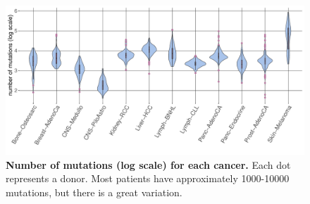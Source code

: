 \begin{figure}[h!]
    \centering
    \includegraphics[scale=0.66]{graphics/mutation_summary.pdf}
    \caption{\textbf{Number of mutations (log scale) for each cancer.} Each dot represents a donor. Most patients have approximately 1000-10000 mutations, but there is a great variation.}
    \label{fig:mutation_summary}
\end{figure}
